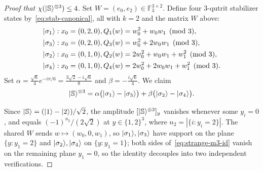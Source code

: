 \documentclass[11pt]{article}
\theoremstyle{definition}
\newcommand{\microspace}{\mspace{0.5mu}}
\newcommand{\ket}[1]{\lvert\microspace #1 \microspace \rangle}
\newcommand{\F}{\mathcal{F}}
\renewcommand{\F}[1]{\mathbb{F}_{#1}}
\newcommand{\chiR}{\chi}
\newcommand{\Strange}{\ket{\mathbb{S}}}
\begin{document}
	\begin{proof}[Proof that $\chiR(\Strange^{\otimes 3}) \le 4$]
		Set $W = (e_0, e_2) \in \F{3}^{3 \times 2}$.
		Define four 3-qutrit stabilizer states by~\eqref{eq:stab-canonical}, all
		with $k = 2$ and the matrix $W$ above:
		\begin{equation}
			\begin{aligned}
				\ket{\sigma_1} &: x_0 = (0, 2, 0), 
				Q_1(w) = w_0^2 + w_0 w_1 \pmod 3, \\
				\ket{\sigma_3} &: x_0 = (0, 2, 0), 
				Q_3(w) = w_0^2 + 2 w_0 w_1 \pmod 3, \\
				\ket{\sigma_2} &: x_0 = (0, 1, 0), 
				Q_2(w) = 2 w_0^2 + w_0 w_1 + w_1^2 \pmod 3, \\
				\ket{\sigma_4} &: x_0 = (0, 1, 0), 
				Q_4(w) = 2 w_0^2 + 2 w_0 w_1 + w_1^2 \pmod 3.
			\end{aligned}
		\end{equation}
		Set $\alpha = \frac{\sqrt 6}{4}  e^{-i \pi / 6} = \frac{3 \sqrt 2 - i \sqrt 6}{8}$
		and $\beta = -\frac{i \sqrt 6}{4}$. We claim
		\begin{equation}\label{eq:strange-m3-id}
			\Strange^{\otimes 3}
			= \alpha \big( \ket{\sigma_1} - \ket{\sigma_3} \big)
			+ \beta \big( \ket{\sigma_2} - \ket{\sigma_4} \big).
		\end{equation}
		
		Since $\Strange = (\ket{1} - \ket{2}) / \sqrt 2$, the amplitude
		$[\Strange^{\otimes 3}]_y$ vanishes whenever some $y_i = 0$, and equals
		$(-1)^{n_2} / (2 \sqrt 2)$ at $y \in \{1, 2\}^3$, where
		$n_2 = |\{i : y_i = 2\}|$. The shared $W$ sends $w \mapsto (w_0, 0, w_1)$,
		so $\ket{\sigma_1}, \ket{\sigma_3}$ have support on the plane $\{y : y_1 = 2\}$ and
		$\ket{\sigma_2}, \ket{\sigma_4}$ on $\{y : y_1 = 1\}$; both sides
		of~\eqref{eq:strange-m3-id} vanish on the remaining plane $y_1 = 0$, so
		the identity decouples into two independent verifications.
		

\end{proof}
\end{document}
